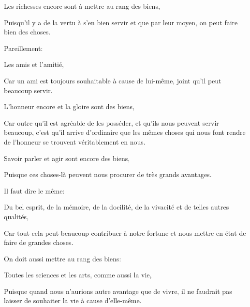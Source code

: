 \bigbreak

\begin{emphpar}
	Les richesses encore sont à mettre au rang des biens, 
\end{emphpar}

Puisqu'il y a de la vertu à s'en bien servir et que par leur moyen, on peut faire bien des choses.

\bigbreak

Pareillement:

\begin{emphpar}
	Les amis et l'amitié,
\end{emphpar}

Car un ami est toujours souhaitable à cause de lui-même, joint qu'il peut beaucoup servir.

\bigbreak

\begin{emphpar}
	L'honneur encore et la gloire sont des biens,
\end{emphpar}

Car outre qu'il est agréable de les posséder, et qu'ils nous peuvent servir beaucoup, c'est qu'il arrive d'ordinaire que les mêmes choses
qui nous font rendre de l'honneur se trouvent véritablement en nous.

\bigbreak

\begin{emphpar}
	Savoir parler et agir sont encore des biens,
\end{emphpar}

Puisque ces choses-là peuvent nous procurer de très grands avantages. 

\bigbreak

Il faut dire le même:

\begin{emphpar}
	Du bel esprit, de la mémoire, de la docilité, de la vivacité et de telles autres qualités,
\end{emphpar}

Car tout cela peut beaucoup contribuer à notre fortune et nous mettre en état de faire de grandes choses. 

\bigbreak

On doit aussi mettre au rang des biens:

\begin{emphpar}
	Toutes les sciences et les arts, comme aussi la vie,
\end{emphpar}

Puisque quand nous n'aurions autre avantage que de vivre, il ne faudrait pas laisser de souhaiter la vie à cause d'elle-même.

